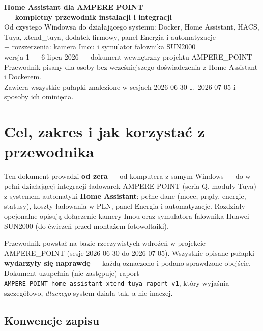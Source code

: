 \documentclass[11pt,a4paper]{article}
\begin{document}
\begin{center}
{\huge\bfseries\sffamily\color{navy} Home Assistant dla AMPERE POINT\\[2pt] --- kompletny przewodnik instalacji i integracji}\\[8pt]
{\large Od czystego Windowsa do działającego systemu: Docker, Home Assistant, HACS,\\ Tuya, xtend\_tuya, dodatek firmowy, panel Energia i automatyzacje\\[2pt] + rozszerzenia: kamera Imou i symulator falownika SUN2000}\\[6pt]
{\normalsize wersja 1 --- 6 lipca 2026 --- dokument wewnętrzny projektu AMPERE\_POINT}\\[2pt]
{\small Przewodnik pisany dla osoby bez wcześniejszego doświadczenia z Home Assistant i Dockerem.\\ Zawiera wszystkie pułapki znalezione w sesjach 2026-06-30 \ldots\ 2026-07-05 i sposoby ich ominięcia.}
\end{center}

\vspace{4pt}
\tableofcontents
\newpage

\section{Cel, zakres i jak korzystać z przewodnika}

Ten dokument prowadzi \textbf{od zera} --- od komputera z samym Windows --- do w pełni działającej integracji ładowarek AMPERE POINT (seria Q, moduły Tuya) z systemem automatyki \textbf{Home Assistant}: pełne dane (moce, prądy, energie, statusy), koszty ładowania w PLN, panel Energia i automatyzacje. Rozdziały opcjonalne opisują dołączenie kamery Imou oraz symulatora falownika Huawei SUN2000 (do ćwiczeń przed montażem fotowoltaiki).

Przewodnik powstał na bazie rzeczywistych wdrożeń w projekcie AMPERE\_POINT (sesje 2026-06-30 do 2026-07-05). Wszystkie opisane pułapki \textbf{wydarzyły się naprawdę} --- każdą oznaczono i podano sprawdzone obejście. Dokument uzupełnia (nie zastępuje) raport \texttt{AMPERE\_POINT\_home\_assistant\_xtend\_tuya\_raport\_v1}, który wyjaśnia szczegółowo, \emph{dlaczego} system działa tak, a nie inaczej.

\subsection{Konwencje zapisu}
\end{document}
